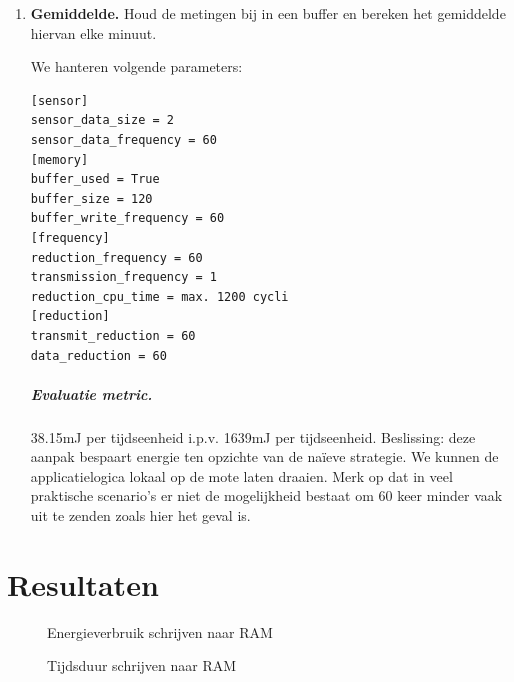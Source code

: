 \documentclass[11pt]{article}
\makeatletter
\def\tikzscale{1}\begin{lrbox}{\measure@tikzpicture}%
\edef\tikzscale{\pgfmathresult}%
\makeatother
\begin{document}
\begin{enumerate}
\item \textbf{Gemiddelde.} Houd de metingen bij in een buffer en bereken
het gemiddelde hiervan elke minuut.

We hanteren volgende parameters:

\begin{verbatim}
[sensor]
sensor_data_size = 2
sensor_data_frequency = 60
[memory]
buffer_used = True
buffer_size = 120
buffer_write_frequency = 60
[frequency]
reduction_frequency = 60
transmission_frequency = 1
reduction_cpu_time = max. 1200 cycli
[reduction]
transmit_reduction = 60
data_reduction = 60
\end{verbatim}

\subparagraph{Evaluatie metric.} 38.15mJ per tijdseenheid i.p.v. 1639mJ per tijdseenheid. Beslissing: deze aanpak bespaart energie ten opzichte van de na\"ieve strategie. We kunnen de applicatielogica lokaal op de mote laten draaien.
Merk op dat in veel praktische scenario's er niet de mogelijkheid bestaat om 60 keer minder vaak uit te zenden zoals hier het geval is.
\end{enumerate}
\section{Resultaten}

\begin{figure}[h]
\centering
\begin{scaletikzpicturetowidth}{\columnwidth}
\end{scaletikzpicturetowidth}
\caption{Energieverbruik schrijven naar RAM}
\label{fig:energieverbruik_ram}
\end{figure}

\begin{figure}[h]
\centering
\begin{scaletikzpicturetowidth}{\columnwidth}
\end{scaletikzpicturetowidth}
\caption{Tijdsduur schrijven naar RAM}
\label{fig:tijdsduur_ram}
\end{figure}
\end{document}
